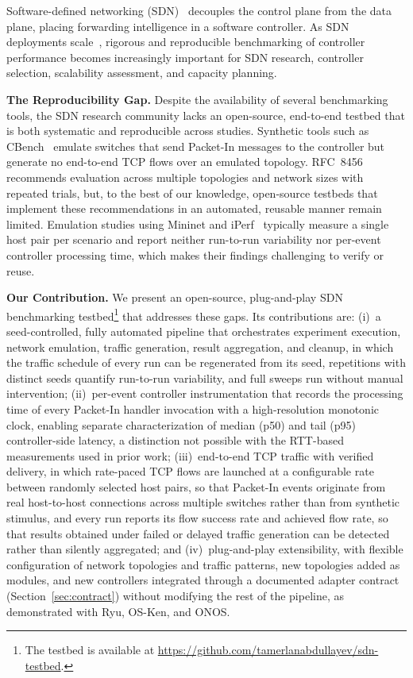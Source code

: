 \documentclass[conference]{IEEEtran}
\begin{document}
Software-defined networking (SDN)~\cite{McKeown2008OpenFlow}
decouples the control plane from the data plane, placing forwarding
intelligence in a software controller. As SDN deployments
scale~\cite{Kreutz2015SDNSurvey}, rigorous and reproducible
benchmarking of controller performance becomes increasingly
important for SDN research, controller selection, scalability
assessment, and capacity planning.

\textbf{The Reproducibility Gap.}
Despite the availability of several benchmarking tools, the SDN
research community lacks an open-source, end-to-end testbed that is
both systematic and reproducible across studies.
Synthetic tools such as CBench~\cite{cbench2012} emulate switches
that send Packet-In messages to the controller but generate no
end-to-end TCP flows over an emulated topology. RFC~8456~\cite{rfc8456}
recommends evaluation across multiple topologies and network sizes
with repeated trials, but, to the best of our knowledge,
open-source testbeds that implement these recommendations in an
automated, reusable manner remain limited. Emulation studies using
Mininet and iPerf~\cite{Koulouras2022RealWorld,
Cabarkapa2022TreeTopology, Ali2024Comparison} typically measure a
single host pair per scenario and report neither run-to-run
variability nor per-event controller processing time, which makes
their findings challenging to verify or reuse.





\textbf{Our Contribution.}
We present an open-source, plug-and-play SDN benchmarking
testbed\footnote{The testbed is available at
\url{https://github.com/tamerlanabdullayev/sdn-testbed}.} that addresses
these gaps. Its contributions are:
(i)~a seed-controlled, fully automated pipeline that orchestrates
experiment execution, network emulation, traffic generation,
result aggregation, and cleanup, in which the traffic schedule of
every run can be regenerated from its seed, repetitions with
distinct seeds quantify run-to-run variability, and full sweeps
run without manual intervention;
(ii)~per-event controller instrumentation that records the
processing time of every Packet-In handler invocation with a
high-resolution monotonic clock, enabling separate
characterization of median (p50) and tail (p95) controller-side
latency, a distinction not possible with the RTT-based
measurements used in prior work;
(iii)~end-to-end TCP traffic with verified delivery, in which
rate-paced TCP flows are launched at a configurable rate between
randomly selected host pairs, so that Packet-In events originate
from real host-to-host connections across multiple switches rather
than from synthetic stimulus, and every run reports its flow
success rate and achieved flow rate, so that results obtained
under failed or delayed traffic generation can be detected rather
than silently aggregated; and
(iv)~plug-and-play extensibility, with flexible configuration of
network topologies and traffic patterns, new topologies added as
modules, and new controllers integrated through a documented
adapter contract (Section~\ref{sec:contract}) without modifying
the rest of the pipeline, as
demonstrated with Ryu, OS-Ken, and ONOS.
\end{document}
